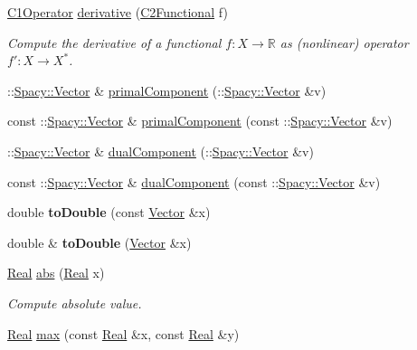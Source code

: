 \begin{DoxyCompactItemize}
\hyperlink{classSpacy_1_1C1Operator}{C1\+Operator} \hyperlink{namespaceSpacy_a002fe344fa6d04a6ac59a74ea25fddb6}{derivative} (\hyperlink{classSpacy_1_1C2Functional}{C2\+Functional} f)
\begin{DoxyCompactList}\small\item\em Compute the derivative of a functional $ f: X\to \mathbb{R} $ as (nonlinear) operator $ f':X\to X^* $. \end{DoxyCompactList}\item 
\+::\hyperlink{classSpacy_1_1Vector}{Spacy\+::\+Vector} \& \hyperlink{group__ProductSpaceGroup_gaa040ba5c24284687e0df19c99dd688a6}{primal\+Component} (\+::\hyperlink{classSpacy_1_1Vector}{Spacy\+::\+Vector} \&v)
\item 
const \+::\hyperlink{classSpacy_1_1Vector}{Spacy\+::\+Vector} \& \hyperlink{group__ProductSpaceGroup_ga88c5bcc74072f75c63ab7d9448f80a7e}{primal\+Component} (const \+::\hyperlink{classSpacy_1_1Vector}{Spacy\+::\+Vector} \&v)
\item 
\+::\hyperlink{classSpacy_1_1Vector}{Spacy\+::\+Vector} \& \hyperlink{group__ProductSpaceGroup_gafe51c084e3b03205db94e91309e834f7}{dual\+Component} (\+::\hyperlink{classSpacy_1_1Vector}{Spacy\+::\+Vector} \&v)
\item 
const \+::\hyperlink{classSpacy_1_1Vector}{Spacy\+::\+Vector} \& \hyperlink{group__ProductSpaceGroup_gabe5978657aab46b1575e2521b336407d}{dual\+Component} (const \+::\hyperlink{classSpacy_1_1Vector}{Spacy\+::\+Vector} \&v)
\item 
double {\bfseries to\+Double} (const \hyperlink{classSpacy_1_1Vector}{Vector} \&x)\hypertarget{namespaceSpacy_aa483f25537054790b8c29403999e7c11}{}\label{namespaceSpacy_aa483f25537054790b8c29403999e7c11}

\item 
double \& {\bfseries to\+Double} (\hyperlink{classSpacy_1_1Vector}{Vector} \&x)\hypertarget{namespaceSpacy_a18c74ced017dd754a0e23d682dbbb77a}{}\label{namespaceSpacy_a18c74ced017dd754a0e23d682dbbb77a}

\item 
\hyperlink{classSpacy_1_1Real}{Real} \hyperlink{namespaceSpacy_a89ed08f6f5a05e3f35afa37fcebf4b06}{abs} (\hyperlink{classSpacy_1_1Real}{Real} x)\hypertarget{namespaceSpacy_a89ed08f6f5a05e3f35afa37fcebf4b06}{}\label{namespaceSpacy_a89ed08f6f5a05e3f35afa37fcebf4b06}

\begin{DoxyCompactList}\small\item\em Compute absolute value. \end{DoxyCompactList}\item 
\hyperlink{classSpacy_1_1Real}{Real} \hyperlink{namespaceSpacy_aa662ae98b86b15b68de7d6ac8fc26696}{max} (const \hyperlink{classSpacy_1_1Real}{Real} \&x, const \hyperlink{classSpacy_1_1Real}{Real} \&y)\hypertarget{namespaceSpacy_aa662ae98b86b15b68de7d6ac8fc26696}{}\label{namespaceSpacy_aa662ae98b86b15b68de7d6ac8fc26696}


\end{DoxyCompactItemize}
